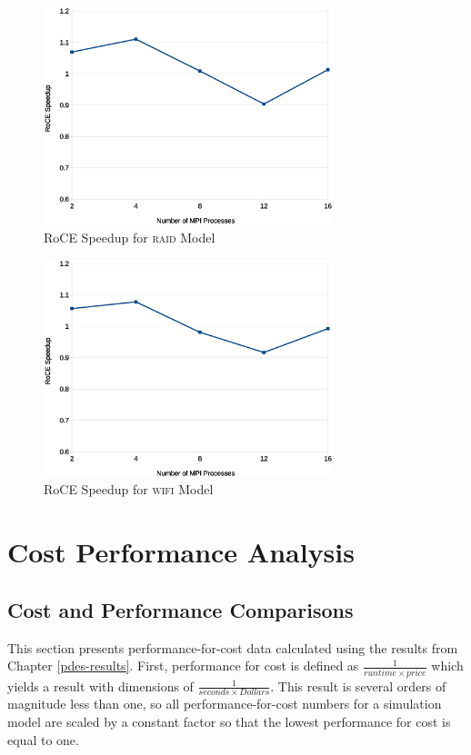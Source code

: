 \documentclass[11pt]{book}
\begin{document}
\begin{figure}
\centering
\includegraphics[width=0.75\textwidth]{raid_speedup}
\caption{RoCE Speedup for \textsc{raid} Model}\label{raid-speedup}
\end{figure}

\begin{figure}
\centering
\includegraphics[width=0.75\textwidth]{wifi_speedup}
\caption{RoCE Speedup for \textsc{wifi} Model}\label{wifi-speedup}
\end{figure}


\chapter{Cost Performance Analysis}\label{analysis}

\section{Cost and Performance Comparisons}

This section presents performance-for-cost data calculated using the results from Chapter
\ref{pdes-results}.  First, performance for cost is defined as $\frac{1}{runtime \times
  price}$ which yields a result with dimensions of $\frac{1}{seconds \times Dollars}$.
This result is several orders of magnitude less than one, so all performance-for-cost
numbers for a simulation model are scaled by a constant factor so that the lowest
performance for cost is equal to one.
\end{document}
